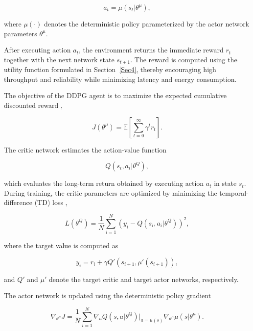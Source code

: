 \documentclass[10pt,journal,compsoc]{IEEEtran}
\begin{document}
\begin{equation}
a_t=\mu(s_t|\theta^\mu),
\end{equation}

where $\mu(\cdot)$ denotes the deterministic policy parameterized by the actor network parameters $\theta^\mu$.

After executing action $a_t$, the environment returns the immediate reward $r_t$ together with the next network state $s_{t+1}$. The reward is computed using the utility function formulated in Section~\ref{Sec4}, thereby encouraging high throughput and reliability while minimizing latency and energy consumption.

The objective of the DDPG agent is to maximize the expected cumulative discounted reward \cite{tariq2025ddpgv2x},

\begin{equation}
J(\theta^\mu)=
\mathbb{E}
\left[
\sum_{t=0}^{\infty}
\gamma^t r_t
\right].
\end{equation}

The critic network estimates the action-value function \cite{tariq2025ddpgv2x}

\begin{equation}
Q(s_t,a_t|\theta^Q),
\end{equation}

which evaluates the long-term return obtained by executing action $a_t$ in state $s_t$. During training, the critic parameters are optimized by minimizing the temporal-difference (TD) loss \cite{tariq2025ddpgv2x,yang2025ddpg},

\begin{equation}
L(\theta^Q)=
\frac{1}{N}
\sum_{i=1}^{N}
\left(y_i-
Q(s_i,a_i|\theta^Q)
\right)^2,
\end{equation}

where the target value is computed as \cite{tariq2025ddpgv2x}

\begin{equation}
y_i=
r_i+
\gamma
Q'
\left(
s_{i+1},
\mu'(s_{i+1})
\right),
\end{equation}

and $Q'$ and $\mu'$ denote the target critic and target actor networks, respectively.

The actor network is updated using the deterministic policy gradient \cite{tariq2025ddpgv2x}

\begin{equation}
\nabla_{\theta^\mu}J
=
\frac{1}{N}
\sum_{i=1}^{N}
\nabla_aQ(s,a|\theta^Q)
\bigg|_{a=\mu(s)}
\nabla_{\theta^\mu}\mu(s|\theta^\mu).
\end{equation}
\end{document}
